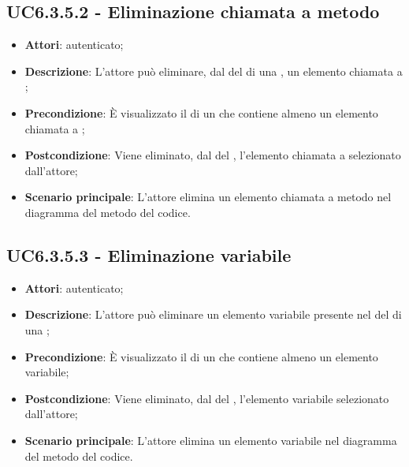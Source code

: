\subsection{UC6.3.5.2 - Eliminazione chiamata a metodo}
\label{ssec:UC6.3.5.2}
\begin{itemize}
\item \textbf{Attori}:  autenticato;
\item \textbf{Descrizione}: L'attore può eliminare, dal  del  di una , un elemento chiamata a ;
\item \textbf{Precondizione}: È visualizzato il  di un  che contiene almeno un elemento chiamata a ;
\item \textbf{Postcondizione}: Viene eliminato, dal  del ,  l'elemento chiamata a  selezionato dall'attore;
\item \textbf{Scenario principale}: L'attore elimina un elemento chiamata a metodo nel diagramma del metodo del codice.
\end{itemize}
\subsection{UC6.3.5.3 - Eliminazione variabile}
\label{ssec:UC6.3.5.3}
\begin{itemize}
\item \textbf{Attori}:  autenticato;
\item \textbf{Descrizione}: L'attore può eliminare un elemento variabile presente nel  del  di una ;
\item \textbf{Precondizione}: È visualizzato il  di un  che contiene almeno un elemento variabile;
\item \textbf{Postcondizione}: Viene eliminato, dal  del ,  l'elemento variabile selezionato dall'attore;
\item \textbf{Scenario principale}: L'attore elimina un elemento variabile nel diagramma del metodo del codice.
\end{itemize}
